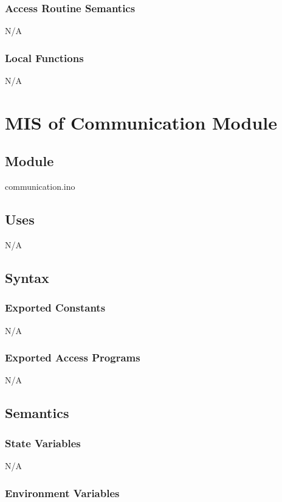 \documentclass[12pt, titlepage]{article}
\begin{document}
\subsubsection{Access Routine Semantics}

N/A

\subsubsection{Local Functions}

N/A
  \section{MIS of Communication Module} \label{communication}

\subsection{Module}

communication.ino

\subsection{Uses}

N/A
\subsection{Syntax}

\subsubsection{Exported Constants}
N/A
\subsubsection{Exported Access Programs}

N/A

\subsection{Semantics}

\subsubsection{State Variables}

N/A

\subsubsection{Environment Variables}
\end{document}

